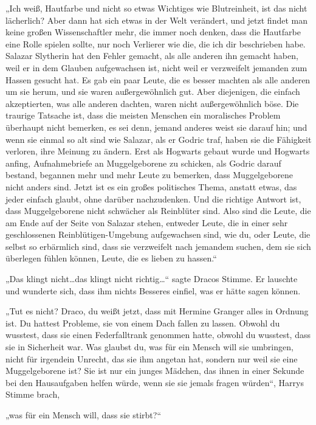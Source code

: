 {„Ich weiß, Hautfarbe und nicht so etwas Wichtiges wie Blutreinheit, ist das nicht lächerlich? Aber dann hat sich etwas in der Welt verändert, und jetzt findet man keine großen Wissenschaftler mehr, die immer noch denken, dass die Hautfarbe eine Rolle spielen sollte, nur noch Verlierer wie die, die ich dir beschrieben habe. Salazar Slytherin hat den Fehler gemacht, als alle anderen ihn gemacht haben, weil er in dem Glauben aufgewachsen ist, nicht weil er verzweifelt jemanden zum Hassen gesucht hat. Es gab ein paar Leute, die es besser machten als alle anderen um sie herum, und sie waren außergewöhnlich gut. Aber diejenigen, die einfach akzeptierten, was alle anderen dachten, waren nicht außergewöhnlich böse. Die traurige Tatsache ist, dass die meisten Menschen ein moralisches Problem überhaupt nicht bemerken, es sei denn, jemand anderes weist sie darauf hin; und wenn sie einmal so alt sind wie Salazar, als er Godric traf, haben sie die Fähigkeit verloren, ihre Meinung zu ändern. Erst als Hogwarts gebaut wurde und Hogwarts anfing, Aufnahmebriefe an Muggelgeborene zu schicken, als Godric darauf bestand, begannen mehr und mehr Leute zu bemerken, dass Muggelgeborene nicht anders sind. Jetzt ist es ein großes politisches Thema, anstatt etwas, das jeder einfach glaubt, ohne darüber nachzudenken. Und die richtige Antwort ist, dass Muggelgeborene nicht schwächer als Reinblüter sind. Also sind die Leute, die am Ende auf der Seite von Salazar stehen, entweder Leute, die in einer sehr geschlossenen Reinblütigen-Umgebung aufgewachsen sind, wie du, oder Leute, die selbst so erbärmlich sind, dass sie verzweifelt nach jemandem suchen, dem sie sich überlegen fühlen können, Leute, die es lieben zu hassen.“

„Das klingt nicht…das klingt nicht richtig…“ sagte Dracos Stimme. Er lauschte und wunderte sich, dass ihm nichts Besseres einfiel, was er hätte sagen können.

„Tut es nicht? Draco, du weißt jetzt, dass mit Hermine Granger alles in Ordnung ist. Du hattest Probleme, sie von einem Dach fallen zu lassen. Obwohl du wusstest, dass sie einen Federfalltrank genommen hatte, obwohl du wusstest, dass sie in Sicherheit war. Was glaubst du, was für ein Mensch will sie umbringen, nicht für irgendein Unrecht, das sie ihm angetan hat, sondern nur weil sie eine Muggelgeborene ist? Sie ist nur ein junges Mädchen, das ihnen in einer Sekunde bei den Hausaufgaben helfen würde, wenn sie sie jemals fragen würden“, Harrys Stimme brach,

„was für ein Mensch will, dass sie stirbt?“

}
